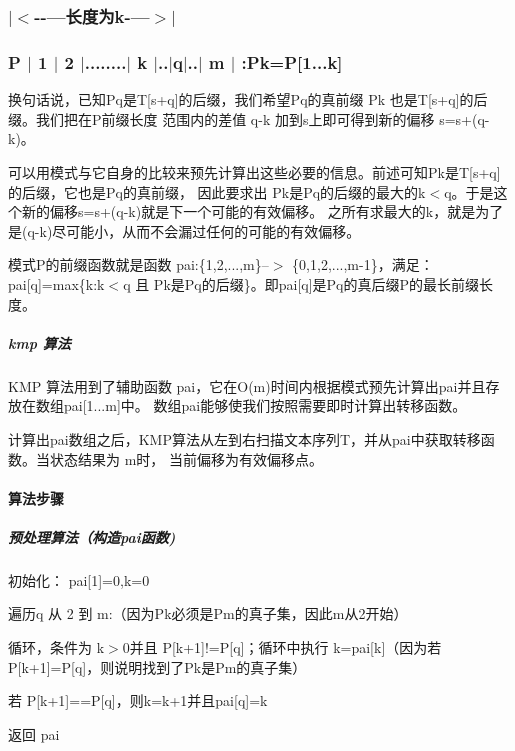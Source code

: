 \subsubsection*{$\vert$$<$-\/-\/---长度为k-\/---$>$$\vert$ }

\subsubsection*{P $\vert$ 1 $\vert$ 2 $\vert$........$\vert$ k $\vert$..$\vert$q$\vert$..$\vert$ m $\vert$ \+:Pk=P\mbox{[}1...k\mbox{]} }

换句话说，已知\+Pq是\+T\mbox{[}s+q\mbox{]}的后缀，我们希望\+Pq的真前缀 Pk 也是\+T\mbox{[}s+q\mbox{]}的后缀。我们把在\+P前缀长度 范围内的差值 q-\/k 加到s上即可得到新的偏移 s\textquotesingle{}=s+(q-\/k)。

可以用模式与它自身的比较来预先计算出这些必要的信息。前述可知\+Pk是\+T\mbox{[}s+q\mbox{]}的后缀，它也是\+Pq的真前缀， 因此要求出 Pk是\+Pq的后缀的最大的k$<$q。于是这个新的偏移s\textquotesingle{}=s+(q-\/k)就是下一个可能的有效偏移。 之所有求最大的k，就是为了是(q-\/k)尽可能小，从而不会漏过任何的可能的有效偏移。

模式\+P的前缀函数就是函数 pai\+:\{1,2,...,m\}--$>$ \{0,1,2,...,m-\/1\}，满足： pai\mbox{[}q\mbox{]}=max\{k\+:k$<$q 且 Pk是\+Pq的后缀\}。即pai\mbox{[}q\mbox{]}是\+Pq的真后缀\+P的最长前缀长度。

\subparagraph*{kmp 算法}

K\+M\+P 算法用到了辅助函数 pai，它在\+O(m)时间内根据模式预先计算出pai并且存放在数组pai\mbox{[}1...m\mbox{]}中。 数组pai能够使我们按照需要即时计算出转移函数。

计算出pai数组之后，\+K\+M\+P算法从左到右扫描文本序列\+T，并从pai中获取转移函数。当状态结果为 m时， 当前偏移为有效偏移点。

\paragraph*{算法步骤}

\subparagraph*{预处理算法（构造pai函数)}


\begin{DoxyItemize}
\item 初始化： pai\mbox{[}1\mbox{]}=0,k=0
\item 遍历q 从 2 到 m\+:（因为\+Pk必须是\+Pm的真子集，因此m从2开始）
\begin{DoxyItemize}
\item 循环，条件为 k$>$0并且 P\mbox{[}k+1\mbox{]}!=P\mbox{[}q\mbox{]}；循环中执行 k=pai\mbox{[}k\mbox{]}（因为若\+P\mbox{[}k+1\mbox{]}=P\mbox{[}q\mbox{]}，则说明找到了\+Pk是\+Pm的真子集）
\item 若 P\mbox{[}k+1\mbox{]}==P\mbox{[}q\mbox{]}，则k=k+1并且pai\mbox{[}q\mbox{]}=k
\end{DoxyItemize}
\item 返回 pai
\end{DoxyItemize}

